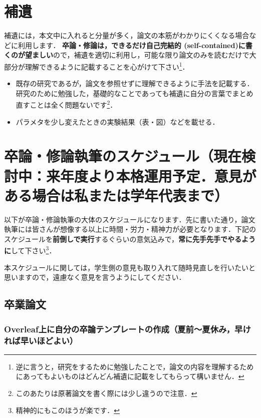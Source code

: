 \documentclass[dvipdfmx,autodetect-engine]{jsreport}
\begin{document}



\clearpage

\appendix 

\chapter{補遺}

補遺には，本文中に入れると分量が多く，論文の本筋がわかりにくくなる場合などに利用します．
\textbf{卒論・修論は，できるだけ自己完結的 (self-contained)に書くのが望ましい}ので，補遺を適切に利用し，可能な限り論文のみを読むだけで大部分が理解できるように記載することを心がけて下さい\footnote{逆に言うと，研究をするために勉強したことで，論文の内容を理解するためにあってもよいものはどんどん補遺に記載をしてもらって構いません．}．
\begin{itemize}
\item 既存の研究であるが，論文を参照せずに理解できるように手法を記載する．研究のために勉強した，基礎的なことであっても補遺に自分の言葉でまとめ直すことは全く問題ないです\footnote{このあたりは原著論文を書く際には少し違うので注意．}．
\item パラメタを少し変えたときの実験結果（表・図）などを載せる．
\end{itemize}


\chapter{卒論・修論執筆のスケジュール（現在検討中：来年度より本格運用予定．意見がある場合は私または学年代表まで）}

以下が卒論・修論執筆の大体のスケジュールになります．先に書いた通り，論文執筆には皆さんが想像する以上に時間・労力・精神力が必要となります．下記のスケジュールを\textbf{前倒しで実行}するぐらいの意気込みで，\textbf{常に先手先手でやるように}して下さい\footnote{精神的にもこのほうが楽です．}．

本スケジュールに関しては，学生側の意見も取り入れて随時見直しを行いたいと思いますので，遠慮なく意見を言うようにしてください．

\section{卒業論文}


\subsection{Overleaf上に自分の卒論テンプレートの作成（夏前〜夏休み，早ければ早いほどよい）}
\end{document}
